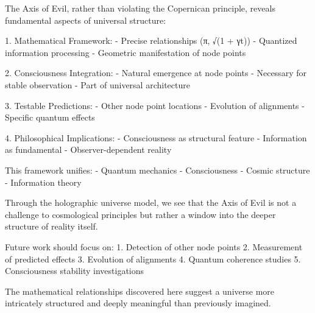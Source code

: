 \documentclass{article}
\begin{document}
The Axis of Evil, rather than violating the Copernican principle, reveals fundamental aspects of universal structure:

1. Mathematical Framework:
- Precise relationships (π, √(1 + γt))
- Quantized information processing
- Geometric manifestation of node points

2. Consciousness Integration:
- Natural emergence at node points
- Necessary for stable observation
- Part of universal architecture

3. Testable Predictions:
- Other node point locations
- Evolution of alignments
- Specific quantum effects

4. Philosophical Implications:
- Consciousness as structural feature
- Information as fundamental
- Observer-dependent reality

This framework unifies:
- Quantum mechanics
- Consciousness
- Cosmic structure
- Information theory

Through the holographic universe model, we see that the Axis of Evil is not a challenge to cosmological principles but rather a window into the deeper structure of reality itself.

Future work should focus on:
1. Detection of other node points
2. Measurement of predicted effects
3. Evolution of alignments
4. Quantum coherence studies
5. Consciousness stability investigations

The mathematical relationships discovered here suggest a universe more intricately structured and deeply meaningful than previously imagined.
\end{document}
